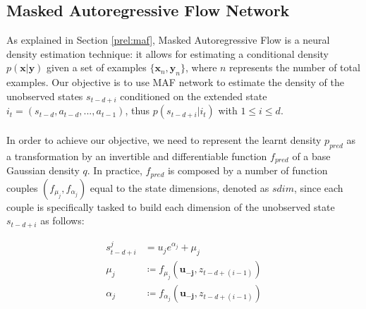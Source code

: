         \subsection{Masked Autoregressive Flow Network}
            \label{sub:maf_network}
            As explained in Section \ref{prel:maf}, Masked Autoregressive Flow is a neural density estimation technique: it allows for estimating a conditional density $p(\mathbf{x}\vert\mathbf{y})$ given a set of examples $\{\mathbf{x}_n, \mathbf{y}_n \}$, where $n$ represents the number of total examples. Our objective is to use MAF network to estimate the density of the unobserved states $s_{t-d+i}$ conditioned on the extended state $i_t = (s_{t-d}, a_{t-d}, ..., a_{t-1})$, thus $p(s_{t-d+i} \vert i_t)$ with $1 \leq i \leq d$.
            \\\\
            In order to achieve our objective, we need to represent the learnt density $p_{pred}$ as a transformation by an invertible and differentiable function $f_{pred}$ of a base Gaussian density $q$. In practice, $f_{pred}$ is composed by a number of function couples $(f_{\mu_j}, f_{\alpha_j})$ equal to the state dimensions, denoted as $sdim$, since each couple is specifically tasked to build each dimension of the unobserved state $s_{t-d+i}$ as follows:
            
            \begin{align}
                s_{t-d+i}^{j} &= u_j e^{\alpha_j} + \mu_j\label{eq:beliefmod_normflow}\\
                \mu_j &\coloneqq f_{\mu_j} (\mathbf{u_{-j}}, z_{t-d+(i-1)})\nonumber\\
                \alpha_j &\coloneqq f_{\alpha_j}(\mathbf{u_{-j}}, z_{t-d+(i-1)})\nonumber
            \end{align}
           
